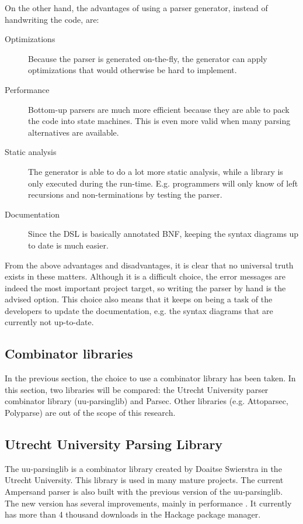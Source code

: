 \noindent
On the other hand, the advantages of using a parser generator, instead of handwriting the code, are:
\begin{description}
	\item[Optimizations] Because the parser is generated on-the-fly, the generator can apply optimizations that would otherwise be hard to implement.
	\item[Performance] Bottom-up parsers are much more efficient because they are able to pack the code into state machines.
		This is even more valid when many parsing alternatives are available.
	\item[Static analysis] The generator is able to do a lot more static analysis, while a library is only executed during the run-time.
    E.g. programmers will only know of left recursions and non-terminations by testing the parser.
	\item[Documentation] Since the DSL is basically annotated BNF, keeping the syntax diagrams up to date is much easier.
\end{description}

\noindent
From the above advantages and disadvantages, it is clear that no universal truth exists in these matters.
Although it is a difficult choice, the error messages are indeed the most important project target, so writing the parser by hand is the advised option.
This choice also means that it keeps on being a task of the developers to update the documentation, e.g. the syntax diagrams that are currently not up-to-date.

\subsection{Combinator libraries}
In the previous section, the choice to use a combinator library has been taken.
In this section, two libraries will be compared: the Utrecht University parser combinator library (uu-parsinglib) and Parsec.
Other libraries (e.g. Attoparsec, Polyparse) are out of the scope of this research.

\subsection{Utrecht University Parsing Library}
%
The uu-parsinglib is a combinator library created by Doaitse Swierstra in the Utrecht University.
This library is used in many mature projects.
The current Ampersand parser is also built with the previous version of the uu-parsinglib.
The new version has several improvements, mainly in performance \cite{benchmark}.
It currently has more than 4 thousand downloads in the Hackage package manager.


